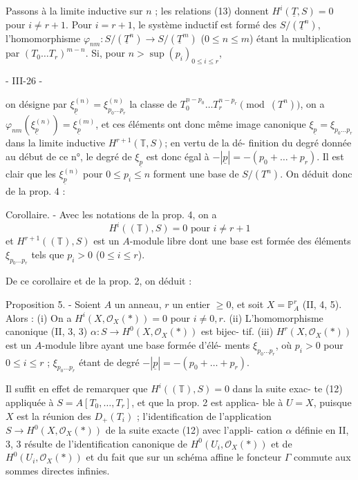 Passons à la limite inductive sur $n$ ; les relations (13) donnent $H^i(\underline{T}, S) = 0$ pour $i \neq r+1$. Pour $i = r+1$, le système inductif est formé des $S/(\underline{T}^n)$, l'homomorphisme $\varphi_{nm} : S/(\underline{T}^n) \to S/(\underline{T}^m)$ ($0 \leq n \leq m$) étant la multiplication par $(T_0 \dots T_r)^{m-n}$. Si, pour $n > \sup(p_i)_{0 \leq i \leq r}$,

\newpage


- III-26 -

on désigne par $\xi_{\underline{p}}^{(n)} = \xi_{p_0 \dots p_r}^{(n)}$ la classe de $T_0^{n-p_0} \dots T_r^{n-p_r} \pmod{(T^n)}$,
on a $\varphi_{nm} (\xi_{\underline{p}}^{(n)}) = \xi_{\underline{p}}^{(m)}$, et ces éléments ont donc même image canonique
$\xi_{\underline{p}} = \xi_{p_0 \dots p_r}$ dans la limite inductive $H^{r+1}(\mathbb{T}, S)$; en vertu de la dé-
finition du degré donnée au début de ce n°, le degré de $\xi_{\underline{p}}$ est donc
égal à $-|\underline{p}| = -(p_0 + \dots + p_r)$. Il est clair que les $\xi_{\underline{p}}^{(n)}$ pour $0 \le p_i \le n$
forment une base de $S/(T^n)$. On déduit donc de la prop. 4 :

Corollaire. - Avec les notations de la prop. 4, on a
$$H^i((\mathbb{T}), S) = 0 \text{ pour } i \neq r+1$$
et $H^{r+1}((\mathbb{T}), S)$ est un $A$-module libre dont une base est formée des
éléments $\xi_{p_0 \dots p_r}$ tels que $p_i > 0$ ($0 \le i \le r$).

De ce corollaire et de la prop. 2, on déduit :

Proposition 5. - Soient $A$ un anneau, $r$ un entier $\ge 0$, et soit $X = \mathbb{P}_A^r$ (II, 4, 5). Alors :
(i) On a $H^i(X, \mathcal{O}_X(*)) = 0$ pour $i \neq 0, r$.
(ii) L'homomorphisme canonique (II, 3, 3) $\alpha : S \to H^0(X, \mathcal{O}_X(*))$ est bijec-
tif.
(iii) $H^r(X, \mathcal{O}_X(*))$ est un $A$-module libre ayant une base formée d'élé-
ments $\xi_{p_0 \dots p_r}$, où $p_i > 0$ pour $0 \le i \le r$ ; $\xi_{p_0 \dots p_r}$ étant de degré $-|\underline{p}| =
-(p_0 + \dots + p_r)$.

Il suffit en effet de remarquer que $H^i((\mathbb{T}), S) = 0$ dans la suite exac-
te (12) appliquée à $S = A[T_0, \dots, T_r]$, et que la prop. 2 est applica-
ble à $U=X$, puisque $X$ est la réunion des $D_+(T_i)$ ; l'identification
de l'application $S \to H^0(X, \mathcal{O}_X(*))$ de la suite exacte (12) avec l'appli-
cation $\alpha$ définie en II, 3, 3 résulte de l'identification canonique
de $H^0(U_i, \mathcal{O}_X(*))$ et de $H^0(U_i, \mathcal{O}_X(*))$ et du fait que sur un schéma affine
le foncteur $\Gamma$ commute aux sommes directes infinies.

